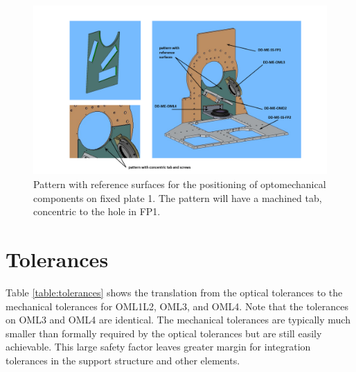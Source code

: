 \documentclass{report}
\begin{document}
\begin{figure}
\begin{center}
\includegraphics[width=1.1\linewidth]{figures/pattern.png}
\end{center}
\caption{Pattern with reference surfaces for the positioning of optomechanical components on fixed plate 1. The pattern will have a machined tab, concentric to the hole in FP1.}
\label{figure:P1_pattern}
\end{figure}


\section{Tolerances}

Table \ref{table:tolerances} shows the translation from the optical tolerances to the mechanical tolerances for OML1L2, OML3, and OML4. Note that the tolerances on OML3 and OML4 are identical. The mechanical tolerances are typically much smaller than formally required by the optical tolerances but are still easily achievable. This large safety factor leaves greater margin for integration tolerances in the support structure and other elements.
\end{document}

